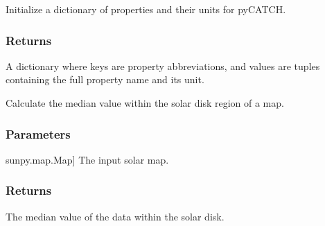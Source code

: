 \documentclass[letterpaper,10pt,english]{sphinxmanual}
\begin{document}
\begin{fulllineitems}
\label{\detokenize{pycatch/utils/extensions:pycatch.utils.extensions.init_props}}
\pysigstartsignatures
{}
\pysigstopsignatures
\sphinxAtStartPar
Initialize a dictionary of properties and their units for pyCATCH.


\subsubsection{Returns}
\label{\detokenize{pycatch/utils/extensions:id5}}\begin{description}
\sphinxAtStartPar
A dictionary where keys are property abbreviations, and values are tuples containing the full property name and its unit.

\end{description}

\end{fulllineitems}


\begin{fulllineitems}
\label{\detokenize{pycatch/utils/extensions:pycatch.utils.extensions.median_disk}}
\pysigstartsignatures
{}
\pysigstopsignatures
\sphinxAtStartPar
Calculate the median value within the solar disk region of a map.


\subsubsection{Parameters}
\label{\detokenize{pycatch/utils/extensions:id6}}\begin{description}
\sphinxlineitem{map}{[}sunpy.map.Map{]}
\sphinxAtStartPar
The input solar map.

\end{description}


\subsubsection{Returns}
\label{\detokenize{pycatch/utils/extensions:id7}}\begin{description}
\sphinxAtStartPar
The median value of the data within the solar disk.

\end{description}

\end{fulllineitems}
\end{document}
